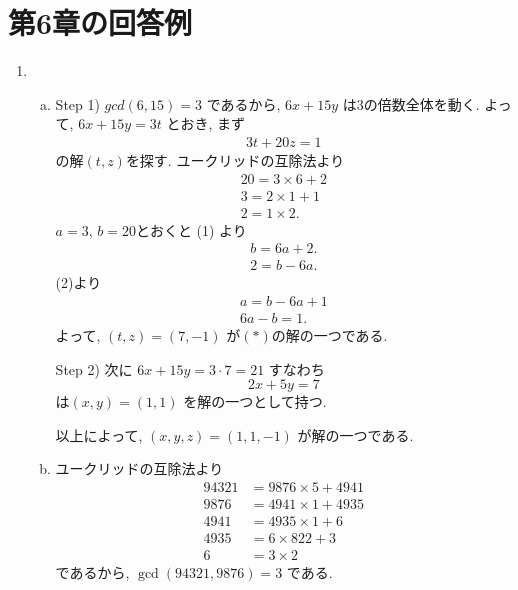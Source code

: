 \section{第6章の回答例} %
\begin{enumerate}[6.1] %
\item
  \begin{enumerate}[(a)]
    \item Step 1) $gcd(6, 15) = 3$ であるから, $6x + 15y$ は3の倍数全体を動く.
    よって, $6x + 15y = 3t$ とおき, まず
    \begin{align}
      3t + 20z = 1  \tag{$\ast$}
    \end{align}
    の解$(t, z)$を探す.
    ユークリッドの互除法より
    \begin{align}
      20 = 3 \times 6 + 2 \tag{1} \\
      3 = 2 \times 1 + 1  \tag{2} \\
      2 = 1 \times 2.  \tag{3}
    \end{align}
    $a = 3$, $b = 20$とおくと (1) より
    \begin{align*}
      b = 6a + 2. \\
      2 = b - 6a.
    \end{align*}
    (2)より
    \begin{align*}
      a = b - 6a + 1 \\
      6a - b = 1.
    \end{align*}
  よって, $(t, z) = (7, -1)$ が$(\ast)$の解の一つである.

  Step 2) 次に $6x + 15y = 3 \cdot 7 = 21$ すなわち
  \[
    2x + 5y = 7
  \]
  は$(x, y) = (1, 1)$ を解の一つとして持つ.

  以上によって, $(x, y, z) = (1, 1, -1)$ が解の一つである.

  \item ユークリッドの互除法より
  \begin{align}
    94321 &= 9876 \times 5   + 4941 \tag{1} \\
    9876  &= 4941 \times 1   + 4935 \tag{2} \\
    4941  &= 4935 \times 1   + 6    \tag{3} \\
    4935  &=    6 \times 822 + 3    \tag{4} \\
       6  &=    3 \times 2          \tag{5}
  \end{align}
  であるから, $\gcd(94321, 9876) = 3$ である.


\end{enumerate}
\end{enumerate}
